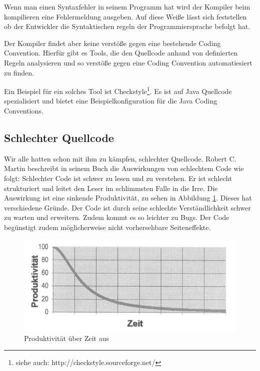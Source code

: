 Wenn man einen Syntaxfehler in seinem Programm hat wird
der Kompiler beim kompilieren eine Fehlermeldung ausgeben.
Auf diese Weiße lässt sich feststellen ob der Entwickler
die Syntaktischen regeln der Programmiersprache befolgt hat.

Der Kompiler findet aber keine verstöße gegen eine bestehende Coding Convention.
Hierfür gibt es Tools, die den Quellcode anhand von definierten Regeln analysieren
und so verstöße gegen eine Coding Convention automatiesiert zu finden.

Ein Beispiel für ein solches Tool ist Checkstyle\footnote{siehe auch: http://checkstyle.sourceforge.net/}.
Es ist auf Java Quellcode spezialisiert und bietet eine Beispielkonfiguration für
die Java Coding Conventions.

\subsection{Schlechter Quellcode}


Wir alle hatten schon mit ihm zu kämpfen, schlechter Quellcode. Robert C. Martin beschreibt in seinem
Buch \cite[S. 27f.]{Martin} die Auswirkungen von schlechtem Code wie folgt: Schlechter Code ist schwer
zu lesen und zu verstehen. Er ist schlecht strukturiert und leitet den Leser im schlimmsten Falle in die Irre.
Die Auswirkung ist eine sinkende Produktivität, zu sehen in Abbildung \ref{grundlagen:produktivitaet}.
Dieses hat verschiedene Gründe. Der Code ist durch seine schlechte Verständlichkeit schwer zu warten und erweitern.
Zudem kommt es so leichter zu Bugs. Der Code begünstigt zudem möglicherweise nicht vorhersehbare Seiteneffekte.

\begin{figure}[H]
	\centering
	\includegraphics[width=\textwidth]{poduktivitaet.jpg}
	\caption{Produktivität über Zeit aus \cite[S. 29]{Martin}}
	\label{grundlagen:produktivitaet}
\end{figure}

